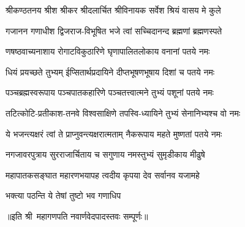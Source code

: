 
\twolineshloka
{श्रीकण्ठतनय श्रीश श्रीकर श्रीदलार्चित}
{श्रीविनायक सर्वेश श्रियं वासय मे कुले}

\twolineshloka
{गजानन गणाधीश द्विजराज-विभूषित}
{भजे त्वां सच्चिदानन्द ब्रह्मणां ब्रह्मणस्पते}

\twolineshloka
{णषष्ठवाच्यनाशाय रोगाटविकुठारिणे}
{घृणापालितलोकाय वनानां पतये नमः}

\twolineshloka
{धियं प्रयच्छते तुभ्यम् ईप्सितार्थप्रदायिने}
{दीप्तभूषणभूषाय दिशां च पतये नमः}

\twolineshloka
{पञ्चब्रह्मस्वरूपाय पञ्चपातकहारिणे}
{पञ्चतत्त्वात्मने तुभ्यं पशूनां पतये नमः}

\twolineshloka
{तटित्कोटि-प्रतीकाश-तनवे विश्वसाक्षिणे}
{तपस्वि-ध्यायिने तुभ्यं सेनानिभ्यश्च वो नमः}

\twolineshloka
{ये भजन्त्यक्षरं त्वां ते प्राप्नुवन्त्यक्षरात्मताम्}
{नैकरूपाय महते मुष्णतां पतये नमः}

\twolineshloka
{नगजावरपुत्राय सुरराजार्चिताय च}
{सगुणाय नमस्तुभ्यं सुमृडीकाय मीढुषे}

\twolineshloka
{महापातकसङ्घात महारणभयापह}
{त्वदीय कृपया देव सर्वानव यजामहे}


{भक्त्या पठन्ति ये तेषां तुष्टो भव गणाधिप}

॥इति श्री~महागणपति नवार्णवेदपादस्तवः सम्पूर्णः॥
